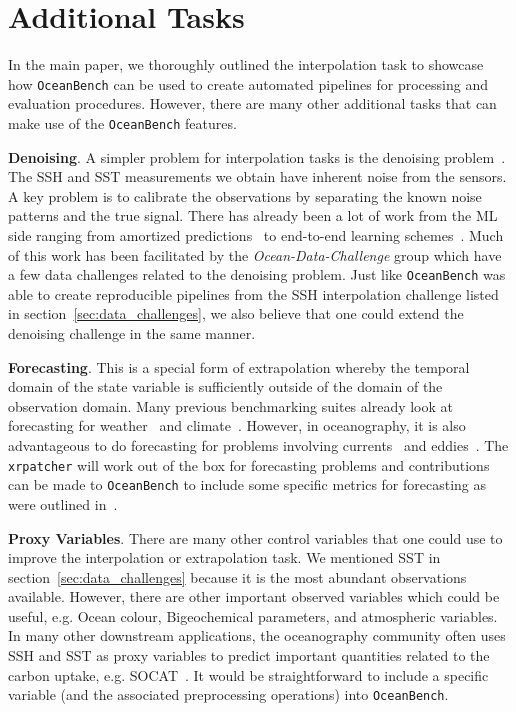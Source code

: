 \section{Additional Tasks}\label{sec:other_tasks}

In the main paper, we thoroughly outlined the interpolation task to showcase how \texttt{OceanBench} can be used to create automated pipelines for processing and evaluation procedures.
However, there are many other additional tasks that can make use of the \texttt{OceanBench} features. 

\textbf{Denoising}. A simpler problem for interpolation tasks is the denoising problem~\cite{DENOISESURVEY,DENOISESURVEY2}.
The SSH and SST measurements we obtain have inherent noise from the sensors.
A key problem is to calibrate the observations by separating the known noise patterns and the true signal.
There has already been a lot of work from the ML side ranging from amortized predictions~\cite{DENOISESWOT} to end-to-end learning schemes~\cite{DENOISESWOT2}.
Much of this work has been facilitated by the \textit{Ocean-Data-Challenge} group which have a few data challenges related to the denoising problem.
Just like \texttt{OceanBench} was able to create reproducible pipelines from the SSH interpolation challenge listed in section~\ref{sec:data_challenges}, we also believe that one could extend the denoising challenge in the same manner.

\textbf{Forecasting}. This is a special form of extrapolation whereby the temporal domain of the state variable is sufficiently outside of the domain of the observation domain. 
Many previous benchmarking suites already look at forecasting for weather~\cite{weatherbench} and climate~\cite{ClimateBench}.
However, in oceanography, it is also advantageous to do forecasting for problems involving currents~\cite{MLSSC,4DVarNetSSC} and eddies~\cite{OCEANEddyTracking,OKUBO,OKUBOWEISS}.
The \texttt{xrpatcher} will work out of the box for forecasting problems and contributions can be made to \texttt{OceanBench} to include some specific metrics for forecasting as were outlined in~\cite{weatherbench,ClimateBench,ENS10Bench}.

\textbf{Proxy Variables}. There are many other control variables that one could use to improve the interpolation or extrapolation task.
We mentioned SST in section~\ref{sec:data_challenges} because it is the most abundant observations available.
However, there are other important observed variables which could be useful, e.g. Ocean colour, Bigeochemical parameters, and atmospheric variables.
In many other downstream applications, the oceanography community often uses SSH and SST as proxy variables to predict important quantities related to the carbon uptake, e.g. SOCAT~\cite{SOCAT}.
It would be straightforward to include a specific variable (and the associated preprocessing operations) into \texttt{OceanBench}.

